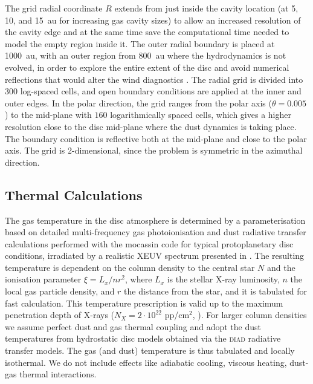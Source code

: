 \documentclass[fleqn,usenatbib]{mnras}
\begin{document}
        The grid radial coordinate $R$ extends from just inside the cavity location (at 5, 10, and \SI{15}{au} for increasing gas cavity sizes) to allow an increased resolution of the cavity edge and at the same time save the computational time needed to model the empty region inside it. The outer radial boundary is placed at \SI{1000}{au}, with an outer region from \SI{800}{au} where the hydrodynamics is not evolved, in order to explore the entire extent of the disc and avoid numerical reflections that would alter the wind diagnostics \citep{Picogna2019}. The radial grid is divided into 300 log-spaced cells, and open boundary conditions are applied at the inner and outer edges.
        In the polar direction, the grid ranges from the polar axis ($\theta = 0.005$) to the mid-plane with $160$ logarithmically spaced cells, which gives a higher resolution close to the disc mid-plane where the dust dynamics is taking place. The boundary condition is reflective both at the mid-plane and close to the polar axis. The grid is 2-dimensional, since the problem is symmetric in the azimuthal direction.
        
    \subsection{Thermal Calculations}\label{sec:mocassin}

        The gas temperature in the disc atmosphere is determined by a parameterisation based on detailed multi-frequency gas photoionisation and dust radiative transfer calculations performed with the {\sc mocassin} code \citep{MOCASSIN1,MOCASSIN2,MOCASSIN3} for typical protoplanetary disc conditions, irradiated by a realistic XEUV spectrum presented in \citet{Ercolano2008,Ercolano2009}.
        The resulting temperature is dependent on the column density to the central star $N$ and the ionisation parameter $\xi=L_x/nr^2$, where $L_x$ is the stellar X-ray luminosity, $n$ the local gas particle density, and $r$ the distance from the star, and it is tabulated for fast calculation.
        This temperature prescription is valid up to the maximum penetration depth of X-rays ($N_X = 2\cdot10^{22}$ pp/cm$^2$, \cite{Ercolano2009}).
        For larger column densities we assume perfect dust and gas thermal coupling and adopt the dust temperatures from hydrostatic disc models obtained via the \textsc{diad} radiative transfer models.
        The gas (and dust) temperature is thus tabulated and locally isothermal. We do not include effects like adiabatic cooling, viscous heating, dust-gas thermal interactions.
       
\end{document}
